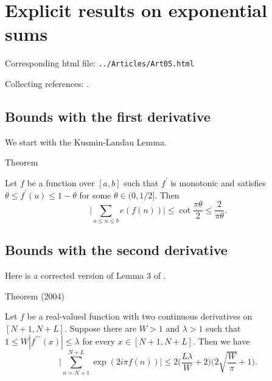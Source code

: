 \chapter{   Explicit results on exponential sums}

Corresponding html file: \texttt{../Articles/Art05.html}










Collecting references:
\cite{Daboussi-Rivat*01}.



 
 


\par 
\section{Bounds with the first derivative}


We start with the Kusmin-Landau Lemma.
\par 
\begin{thm}{Theorem}

    Let $f$ be a function over $[a, b]$ such that $f^\prime$ is monotonic
    and satisfies $\theta \le f^\prime(u)\le 1-\theta$ for some $\theta
    \in(0,1/2]$. Then
    $$
    \biggl|\sum_{a\le n\le b} e(f(n))\biggr|
    \le
    \cot\frac{\pi\theta}{2}\le \frac{2}{\pi \theta}.
    $$
\end{thm}



\par 
\section{Bounds with the second derivative}


  Here is a corrected version of Lemma 3 of
  \cite{Cheng-Graham*01}.
\par 
\begin{thm}{Theorem (2004)}

  Let $f$ be a real-valued function with two continuous derivatives
  on $[N+1, N+L]$. Suppose there are $W > 1$ and $\lambda > 1$ such
  that $1 \le W |f^{\prime\prime\prime}(x)| \le \lambda$ for every $x\in [N+1,
  N+L]$. Then we have
  $$
  \biggl|\sum_{n= N+1}^{N+L}
  \exp( 2i\pi f(n)) \biggr|
  \le 2\biggl(\frac{L \lambda}{W} +2\biggr)
  \biggl(2\sqrt{\frac{W}{\pi}} + 1\biggr).
  $$
\end{thm}



